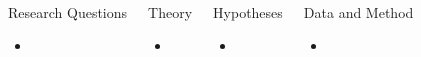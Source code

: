 \documentclass[mathserif]{beamer}
\title{\quad\quad{XXX}}
\date{}
\begin{document}
\begin{frame}{~} 
\begin{columns}[t]

\begin{block}{Research Questions}
\begin{itemize}
\item 
\end{itemize}
\end{block}

\begin{block}{Theory}
\begin{itemize}
	\item
\end{itemize}	
\end{block}	

\begin{block}{Hypotheses}
\begin{itemize}
	\item 
\end{itemize}	
\end{block}	

\begin{block}{Data and Method}
\begin{itemize}
\item 
\end{itemize} 
\end{block}


\end{columns}
\end{frame}
\end{document}
